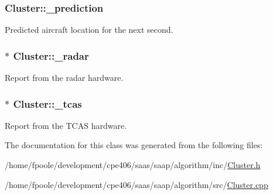 \subsubsection[{\+\_\+prediction}]{ Cluster\+::\+\_\+prediction}\label{class_cluster_a7c4db5664d0b443e2957241c774f9eec}
Predicted aircraft location for the next second. \hypertarget{class_cluster_a0a84e94aa8852d266191b0b42f09a335}{}
\subsubsection[{\+\_\+radar}]{$\ast$ Cluster\+::\+\_\+radar}\label{class_cluster_a0a84e94aa8852d266191b0b42f09a335}
Report from the radar hardware. \hypertarget{class_cluster_a1f0fe867c014f712107f0e9520e24fd6}{}
\subsubsection[{\+\_\+tcas}]{$\ast$ Cluster\+::\+\_\+tcas}\label{class_cluster_a1f0fe867c014f712107f0e9520e24fd6}
Report from the T\+C\+A\+S hardware. 

The documentation for this class was generated from the following files\+:\begin{DoxyCompactItemize}
\item 
/home/fpoole/development/cpe406/saas/saap/algorithm/inc/\hyperlink{_cluster_8h}{Cluster.\+h}\item 
/home/fpoole/development/cpe406/saas/saap/algorithm/src/\hyperlink{_cluster_8cpp}{Cluster.\+cpp}\end{DoxyCompactItemize}
